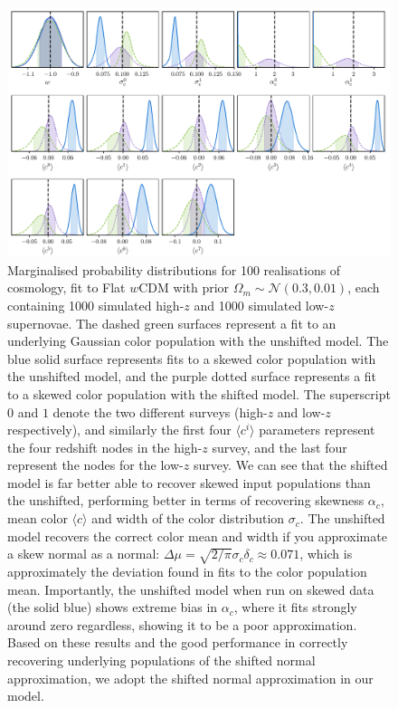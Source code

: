 \documentclass[twocolumn,trackchanges,tighten]{aastex62}
\begin{document}
\begin{figure}
	\begin{center}
		\includegraphics[width=\textwidth]{simple_w_shift_dist_0.pdf}
	\end{center}
	\caption{Marginalised probability distributions for 100 realisations of cosmology, fit to Flat $w$CDM with prior $\Omega_m \sim \mathcal{N}(0.3, 0.01)$, each containing 1000 simulated high-$z$ and 1000 simulated low-$z$ supernovae. The dashed green surfaces represent a fit to an underlying Gaussian color population with the unshifted model. The blue solid surface represents fits to a skewed color population with the unshifted model, and the purple dotted surface represents a fit to a skewed color population with the shifted model. The superscript $0$ and $1$ denote the two different surveys (high-$z$ and low-$z$ respectively), and similarly the first four $\langle c^i \rangle$ parameters represent the four redshift nodes in the high-$z$ survey, and the last four represent the nodes for the low-$z$ survey. We can see that the shifted model is far better able to recover skewed input populations than the unshifted, performing better in terms of recovering skewness $\alpha_c$, mean color $\langle c \rangle$ and width of the color distribution $\sigma_c$. The unshifted model recovers the correct color mean and width if you approximate a skew normal as a normal: $\Delta\mu = \sqrt{2/\pi}\sigma_c\delta_c \approx 0.071$, which is approximately the deviation found in fits to the color population mean. Importantly, the unshifted model when run on skewed data (the solid blue) shows extreme bias in $\alpha_c$, where it fits strongly around zero regardless, showing it to be a poor approximation. Based on these results and the good performance in correctly recovering underlying populations of the shifted normal approximation, we adopt the shifted normal approximation in our model.}
	\label{fig:simple_w_super}
\end{figure}
\end{document}
